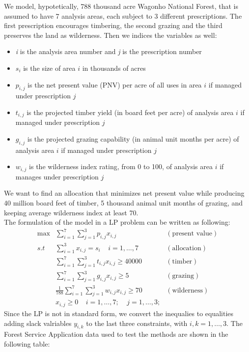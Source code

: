 \documentclass[a4paper,10 pt,titlepage,twoside]{book}
\theoremstyle{plain}
\theoremstyle{definition}
\theoremstyle{remark}
\begin{document}
We model, hypotetically, 788 thousand acre Wagonho National Forest, that is assumed to have 7 analysis areas, each subject to 3 different prescriptions. The first prescription encourages timbering, the second grazing and the third preserves the land as wilderness. Then we indices the variables as well:
\begin{itemize}
	\item \textit{i} is the analysis area number and \textit{j} is the prescription number
	\item $s_{i}$ is the size of area $i$ in thousands of acres
	\item $p_{i,j}$ is the net present value (PNV) per acre of all uses in area $i$ if managed under prescription $j$
	\item $t_{i,j}$ is the projected timber yield (in board feet per acre) of analysis area $i$ if managed under prescription $j$
	\item $g_{i,j}$ is the projected grazing capability (in animal unit months per acre) of analysis area $i$ if managed under prescription $j$
	\item $w_{i,j}$ is the wilderness index rating, from 0 to 100, of analysis area $i$ if manages under prescription $j$
\end{itemize}
We want to find an allocation that minimizes net present value while producing 40 million board feet of timber, 5 thousand animal unit months of grazing, and keeping average wilderness index at least 70.\\
The formulation of the model in a LP problem can be written as following:
\begin{align*}
\max&\sum_{i=1}^{7}\sum_{j=1}^{3} p_{i,j}x_{i,j}&(\text{present value})\\
s.t& \sum_{i=1}^{3}x_{i,j}=s_{i}\;\;\;\;i = 1, \dots,7&(\text{allocation})\\
&\sum_{i=1}^{7}\sum_{j=1}^{3} t_{i,j}x_{i,j}\geq 40000&(\text{timber})\\
&\sum_{i=1}^{7}\sum_{j=1}^{3} g_{i,j}x_{i,j}\geq5&(\text{grazing})\\
&\frac{1}{788}\sum_{i=1}^{7}\sum_{j=1}^{3} w_{i,j}x_{i,j}\geq 70&(\text{wilderness})\\
&x_{i,j}\geq 0 \;\;\;\;i = 1,\dots,7;\;\;\;\;j = 1,\dots,3;
\end{align*}
Since the LP is not in standard form, we convert the inequalies to equalities adding slack valriables $y_{i,k}$ to the last three constraints, with $i, k = 1, \dots, 3$. The Forest Service Application data used to test the methods are shown in the following table:\\
\end{document}
